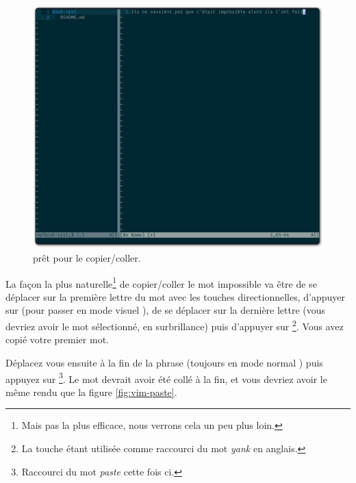 \begin{figure}%
  \includegraphics[width=\linewidth]{graphics/vim-twain.png}
  \caption{\vim prêt pour le copier/coller.}
  \label{fig:vim-twain}
\end{figure}

La façon la plus naturelle\footnote{Mais pas la plus efficace, nous verrons cela un peu plus loin.} de copier/coller le mot \og impossible \fg{} va être de se déplacer sur la première lettre du mot avec les touches directionnelles, d'appuyer sur \ttv (pour passer en mode \og visuel \fg), de se déplacer sur la dernière lettre (vous devriez avoir le mot sélectionné, en surbrillance) puis d'appuyer sur \tty\footnote{La touche \ty étant utilisée comme raccourci du mot \emph{yank} en anglais.}. Vous avez copié votre premier mot.

Déplacez vous ensuite à la fin de la phrase (toujours en mode \og normal \fg) puis appuyez sur \ttp\footnote{Raccourci du mot \emph{paste} cette fois ci.}. Le mot devrait avoir été collé à la fin, et vous devriez avoir le même rendu que la figure \ref{fig:vim-paste}.

